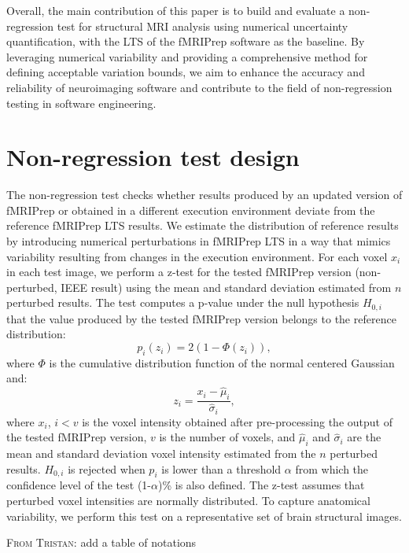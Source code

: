 \documentclass{article}
\newcommand{\TG}[1]{\color{blue}\textsc{From Tristan:} #1\color{black}\xspace}
\begin{document}
Overall, the main contribution of this paper is to build and evaluate a non-regression test for structural MRI analysis using numerical uncertainty quantification, with the LTS of the fMRIPrep software as the baseline. By leveraging numerical variability and providing a comprehensive method for defining acceptable variation bounds, we aim to enhance the accuracy and reliability of neuroimaging software and contribute to the field of non-regression testing in software engineering.

\section{Non-regression test design}

The non-regression test checks whether results produced by an updated version of fMRIPrep or obtained in a different execution environment deviate from the reference fMRIPrep LTS results. We estimate the distribution of reference results by introducing numerical perturbations in fMRIPrep LTS in a way that mimics variability resulting from changes in the execution environment.  For each voxel $x_i$ in each test image, we perform a z-test for the tested fMRIPrep version (non-perturbed, IEEE result) using the mean and standard deviation estimated from $n$ perturbed results. The test computes a p-value under the null hypothesis $H_{0,i}$ that the value produced by the tested fMRIPrep version belongs to the reference distribution:
\begin{equation}
    \label{eqn:pval}
    p_i(z_i) = 2 \left(1-\Phi(z_i)\right),
\end{equation}
where $\Phi$ is the cumulative distribution function of the normal centered
Gaussian and:
\begin{equation*}
    z_i = \frac{x_i-\hat \mu_i}{\hat \sigma_i},
\end{equation*}
where $x_i$, $i < v$ is the voxel intensity obtained after pre-processing the output of the tested fMRIPrep version, $v$ is the number of voxels, and $\hat \mu_i$ and $\hat \sigma_i$ are the mean and standard deviation voxel intensity estimated from the $n$ perturbed results. $H_{0,i}$ is rejected when $p_i$ is lower than a threshold $\alpha$ from which the confidence level of the test (1-$\alpha$)\% is also defined. The z-test assumes that perturbed voxel intensities are normally distributed. To capture anatomical variability, we perform this test on a representative set of brain structural images.

\TG{add a table of notations}
\end{document}
